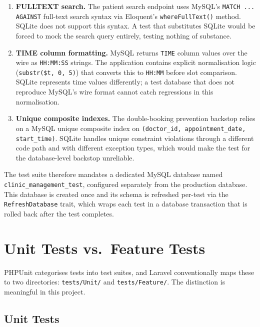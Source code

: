 \begin{enumerate}
  \item \textbf{FULLTEXT search.} The patient search endpoint uses
    MySQL's \texttt{MATCH ... AGAINST} full-text search syntax via
    Eloquent's \texttt{whereFullText()} method. SQLite does not support
    this syntax. A test that substitutes SQLite would be forced to
    mock the search query entirely, testing nothing of substance.

  \item \textbf{TIME column formatting.} MySQL returns \texttt{TIME}
    column values over the wire as \texttt{HH:MM:SS} strings. The
    application contains explicit normalisation logic
    (\texttt{substr(\$t, 0, 5)}) that converts this to \texttt{HH:MM}
    before slot comparison. SQLite represents time values differently;
    a test database that does not reproduce MySQL's wire format cannot
    catch regressions in this normalisation.

  \item \textbf{Unique composite indexes.} The double-booking prevention
    backstop relies on a MySQL unique composite index on
    \texttt{(doctor\_id, appointment\_date, start\_time)}. SQLite
    handles unique constraint violations through a different code path
    and with different exception types, which would make the test for
    the database-level backstop unreliable.
\end{enumerate}

The test suite therefore mandates a dedicated MySQL database named
\texttt{clinic\_management\_test}, configured separately from the
production database. This database is created once and its schema is
refreshed per-test via the \texttt{RefreshDatabase} trait, which wraps
each test in a database transaction that is rolled back after the test
completes.

\section{Unit Tests vs.\ Feature Tests}
\label{sec:unit-vs-feature}

PHPUnit categorises tests into test suites, and Laravel conventionally
maps these to two directories: \texttt{tests/Unit/} and
\texttt{tests/Feature/}. The distinction is meaningful in this project.

\subsection{Unit Tests}

